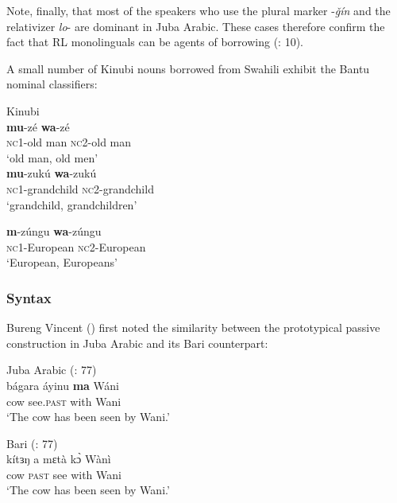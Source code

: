 \documentclass[output=paper]{langsci/langscibook}
\begin{document}
Note, finally, that most of the speakers who use the plural marker -\textit{ǧín} and the relativizer \textit{lo}{}- are dominant in Juba Arabic. These cases therefore confirm the fact that RL monolinguals can be agents of borrowing (\citealt{VanCoetsem1988}: 10).

A small number of Kinubi nouns borrowed from Swahili exhibit the Bantu nominal classifiers:

\ea\label{ex:key:}

{Kinubi \citep[57]{Wellens2003}}\\
 
\ea\textbf{mu}-zé               \textbf{wa}-zé\\
 
{\textsc{nc}1-old man   \textsc{nc2}-old man}\\
 {`old man, old men'}\\
 
\ex
\gll  \textbf{mu}-zukú \textbf{wa}-zukú\\
          \textsc{nc}1-grandchild   \textsc{nc}2-grandchild\\
\glt       `grandchild, grandchildren'

\ex
\gll \textbf{m}-zúngu \textbf{wa}-zúngu\\
         \textsc{nc}1-European   \textsc{nc}2-European\\
\glt       `European, Europeans'
\z
\z

 \subsubsection{Syntax}

Bureng Vincent (\citeyear[77]{BurengVincent1986}) first noted the similarity between the prototypical passive construction in Juba Arabic and its Bari counterpart:


\ea
{Juba Arabic (\citealt{BurengVincent1986}: 77)}\\
\ea\gll  bágara áyinu \textbf{ma} Wáni\\
        cow see.\textsc{past} with Wani\\
\glt      `The cow has been seen by Wani.'

\ex\label{ex:key:}
{Bari (\citealt{BurengVincent1986}: 77)}\\
\gll             kítɜŋ a mɛtà kɔ̀ Wànì\\
                 cow \textsc{past} see with Wani\\
\glt     `The cow has been seen by Wani.'
\z
\z
\end{document}
